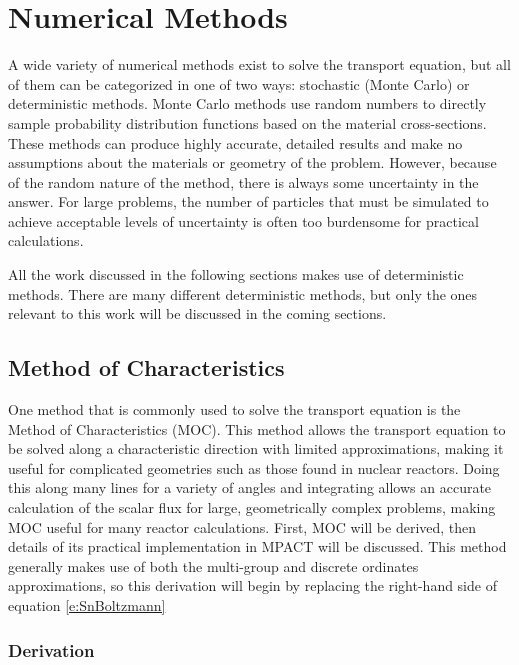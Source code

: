 \section{Numerical Methods}

A wide variety of numerical methods exist to solve the transport equation, but all of them can be categorized in one of two ways: stochastic (Monte Carlo) or deterministic methods.  Monte Carlo methods use random numbers to directly sample probability distribution functions based on the material cross-sections.  These methods can produce highly accurate, detailed results and make no assumptions about the materials or geometry of the problem.  However, because of the random nature of the method, there is always some uncertainty in the answer.  For large problems, the number of particles that must be simulated to achieve acceptable levels of uncertainty is often too burdensome  for practical calculations.

All the work discussed in the following sections makes use of deterministic methods.  There are many different deterministic methods, but only the ones relevant to this work will be discussed in the coming sections.

\subsection{Method of Characteristics}

One method that is commonly used to solve the transport equation is the Method of Characteristics (MOC).  This method allows the transport equation to be solved along a characteristic direction with limited approximations, making it useful for complicated geometries such as those found in nuclear reactors.  Doing this along many lines for a variety of angles and integrating allows an accurate calculation of the scalar flux for large, geometrically complex problems, making MOC useful for many reactor calculations.  First, MOC will be derived, then details of its practical implementation in MPACT will be discussed.   This method generally makes use of both the multi-group and discrete ordinates approximations, so this derivation will begin by replacing the right-hand side of equation \ref{e:SnBoltzmann}

\subsubsection{Derivation}

